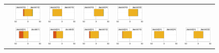 \begin{landscape}
\begin{figure}
\begin{center}
{\begin{tabular}{c|cccccc}
&
\includegraphics[width=.135\columnwidth]{plots/Jacobi(16)_vs_Jacobi(12).pdf}
&
\includegraphics[width=.135\columnwidth]{plots/Jacobi(16)_vs_Jacobi(16).pdf}
&
\includegraphics[width=.135\columnwidth]{plots/Jacobi(16)_vs_Jacobi(24).pdf}
&
\includegraphics[width=.135\columnwidth]{plots/Jacobi(16)_vs_Jacobi(32).pdf}
\\
&
\includegraphics[width=.135\columnwidth]{plots/Jacobi(24)_vs_Jacobi(1).pdf}
&
\includegraphics[width=.135\columnwidth]{plots/Jacobi(24)_vs_Jacobi(8).pdf}
&
\includegraphics[width=.135\columnwidth]{plots/Jacobi(24)_vs_Jacobi(12).pdf}
&
\includegraphics[width=.135\columnwidth]{plots/Jacobi(24)_vs_Jacobi(16).pdf}
&
\includegraphics[width=.135\columnwidth]{plots/Jacobi(24)_vs_Jacobi(24).pdf}
&
\includegraphics[width=.135\columnwidth]{plots/Jacobi(24)_vs_Jacobi(32).pdf}

\end{tabular}}
\end{center}
\end{figure}
\end{landscape}
